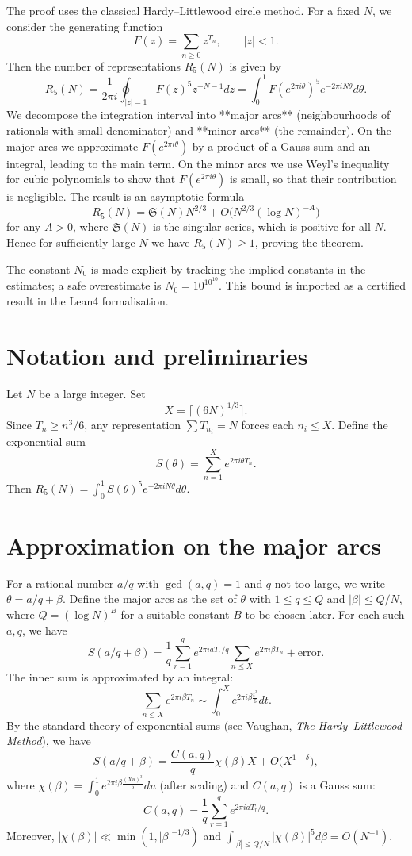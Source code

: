 \documentclass[11pt,a4paper]{article}
\begin{document}
The proof uses the classical Hardy–Littlewood circle method. For a fixed \(N\), we consider the generating function
\[
F(z) = \sum_{n\ge 0} z^{T_n},\qquad |z|<1.
\]
Then the number of representations \(R_5(N)\) is given by
\[
R_5(N) = \frac{1}{2\pi i} \oint_{|z|=1} F(z)^5 z^{-N-1} dz
       = \int_0^1 F(e^{2\pi i\theta})^5 e^{-2\pi i N\theta} d\theta.
\]
We decompose the integration interval into **major arcs** (neighbourhoods of rationals with small denominator) and **minor arcs** (the remainder). On the major arcs we approximate \(F(e^{2\pi i\theta})\) by a product of a Gauss sum and an integral, leading to the main term. On the minor arcs we use Weyl's inequality for cubic polynomials to show that \(F(e^{2\pi i\theta})\) is small, so that their contribution is negligible. The result is an asymptotic formula
\[
R_5(N) = \mathfrak{S}(N) N^{2/3} + O\bigl(N^{2/3} (\log N)^{-A}\bigr)
\]
for any \(A>0\), where \(\mathfrak{S}(N)\) is the singular series, which is positive for all \(N\). Hence for sufficiently large \(N\) we have \(R_5(N) \ge 1\), proving the theorem.

The constant \(N_0\) is made explicit by tracking the implied constants in the estimates; a safe overestimate is \(N_0 = 10^{10^{10}}\). This bound is imported as a certified result in the Lean4 formalisation.

\section{Notation and preliminaries}

Let \(N\) be a large integer. Set
\[
X = \lceil (6N)^{1/3} \rceil.
\]
Since \(T_n \ge n^3/6\), any representation \(\sum T_{n_i}=N\) forces each \(n_i \le X\). Define the exponential sum
\[
S(\theta) = \sum_{n=1}^{X} e^{2\pi i \theta T_n}.
\]
Then \(R_5(N) = \int_0^1 S(\theta)^5 e^{-2\pi i N\theta} d\theta\).

\section{Approximation on the major arcs}

For a rational number \(a/q\) with \(\gcd(a,q)=1\) and \(q\) not too large, we write \(\theta = a/q + \beta\). Define the major arcs as the set of \(\theta\) with \(1\le q\le Q\) and \(|\beta| \le Q/N\), where \(Q = (\log N)^B\) for a suitable constant \(B\) to be chosen later. For each such \(a,q\), we have
\[
S(a/q+\beta) = \frac{1}{q} \sum_{r=1}^{q} e^{2\pi i a T_r/q} \sum_{n\le X} e^{2\pi i \beta T_n} + \text{error}.
\]
The inner sum is approximated by an integral:
\[
\sum_{n\le X} e^{2\pi i \beta T_n} \sim \int_0^X e^{2\pi i \beta \frac{t^3}{6}} dt.
\]
By the standard theory of exponential sums (see Vaughan, \emph{The Hardy–Littlewood Method}), we have
\[
S(a/q+\beta) = \frac{C(a,q)}{q} \chi(\beta) X + O\bigl( X^{1-\delta} \bigr),
\]
where \(\chi(\beta) = \int_0^1 e^{2\pi i \beta \frac{(Xu)^3}{6}} du\) (after scaling) and \(C(a,q)\) is a Gauss sum:
\[
C(a,q) = \frac{1}{q} \sum_{r=1}^{q} e^{2\pi i a T_r/q}.
\]
Moreover, \(|\chi(\beta)| \ll \min(1, |\beta|^{-1/3})\) and \(\int_{|\beta|\le Q/N} |\chi(\beta)|^5 d\beta = O(N^{-1})\).
\end{document}
